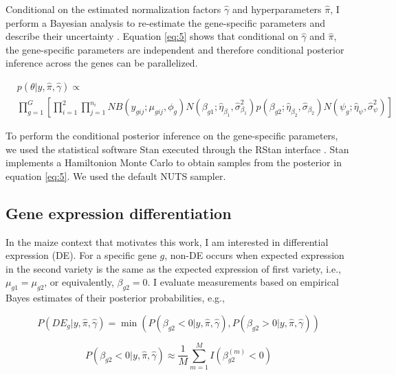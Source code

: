 Conditional on the estimated normalization factors $\hat{\gamma}$ and hyperparameters $\hat{\pi}$, I perform a Bayesian analysis to re-estimate the gene-specific parameters and describe their uncertainty \citep{niemi2015empirical}. Equation \ref{eq:5} shows that conditional on $\hat{\gamma}$ and $\hat{\pi}$, the gene-specific parameters are independent and therefore conditional posterior inference across the genes can be parallelized. 

\begin{equation}
\label{eq:5}
\begin{split}
& p(\theta | y, \hat{\pi}, \hat{\gamma})  \propto \\ & \prod_{g=1}^{G} \left[ \prod_{i=1}^{2} \prod_{j=1}^{n_i} NB(y_{gij} ; \mu_{gij}, \phi_g) N(\beta_{g1} ; \hat{\eta}_{\beta_1}, \hat{\sigma}^2_{\beta_1}) p(\beta_{g2} ; \hat{\eta}_{\beta_2}, \hat{\sigma}_{\beta_2}) N(\psi_g ; \hat{\eta}_{\psi}, \hat{\sigma}^2_{\psi})  \right]
\end{split}
\end{equation}

To perform the conditional posterior inference on the gene-specific parameters, we used the statistical software Stan \citep{stan2014stan} executed through the RStan interface \citep{team2016rstan}. Stan implements a Hamiltonion Monte Carlo \citep{neal2011mcmc} to obtain samples from the posterior in equation \ref{eq:5}. We used the default NUTS sampler\citep{annis2017bayesian}.


\subsection{Gene expression differentiation}

In the maize context that motivates this work, I am interested in differential expression (DE). For a specific gene $g$, non-DE occurs when expected expression in the second variety is the same as the expected expression of first variety, i.e., $\mu_{g1} = \mu_{g2}$, or equivalently, $\beta_{g2}=0$.  I evaluate measurements based on empirical Bayes estimates of their posterior probabilities, e.g., 

\begin{equation}
\label{eq:6}
P(DE_g | y, \hat{\pi}, \hat{\gamma}) =\min( P(\beta_{g2}< 0 | y, \hat{\pi}, \hat{\gamma}),  P(\beta_{g2}> 0 | y, \hat{\pi}, \hat{\gamma}))
\end{equation}

$$P(\beta_{g2}< 0 | y, \hat{\pi}, \hat{\gamma}) \approx \frac{1}{M} \sum_{m=1}^M I(\beta_{g2} ^ {(m)} < 0)$$

